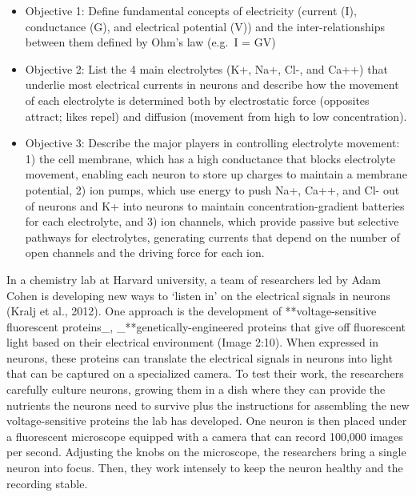 \documentclass[
]{book}
\begin{document}
\begin{itemize}
\item
  Objective 1: Define fundamental concepts of electricity (current (I), conductance (G), and electrical potential (V)) and the inter-relationships between them defined by Ohm's law (e.g.~I = GV)
\item
  Objective 2: List the 4 main electrolytes (K+, Na+, Cl-, and Ca++) that underlie most electrical currents in neurons and describe how the movement of each electrolyte is determined both by electrostatic force (opposites attract; likes repel) and diffusion (movement from high to low concentration).
\item
  Objective 3: Describe the major players in controlling electrolyte movement: 1) the cell membrane, which has a high conductance that blocks electrolyte movement, enabling each neuron to store up charges to maintain a membrane potential, 2) ion pumps, which use energy to push Na+, Ca++, and Cl- out of neurons and K+ into neurons to maintain concentration-gradient batteries for each electrolyte, and 3) ion channels, which provide passive but selective pathways for electrolytes, generating currents that depend on the number of open channels and the driving force for each ion.
\end{itemize}

In a chemistry lab at Harvard university, a team of researchers led by Adam Cohen is developing new ways to `listen in' on the electrical signals in neurons (Kralj et al., 2012). One approach is the development of **voltage-sensitive fluorescent proteins\_, \_**genetically-engineered proteins that give off fluorescent light based on their electrical environment (Image 2:10). When expressed in neurons, these proteins can translate the electrical signals in neurons into light that can be captured on a specialized camera. To test their work, the researchers carefully culture neurons, growing them in a dish where they can provide the nutrients the neurons need to survive plus the instructions for assembling the new voltage-sensitive proteins the lab has developed. One neuron is then placed under a fluorescent microscope equipped with a camera that can record 100,000 images per second. Adjusting the knobs on the microscope, the researchers bring a single neuron into focus. Then, they work intensely to keep the neuron healthy and the recording stable.
\end{document}
